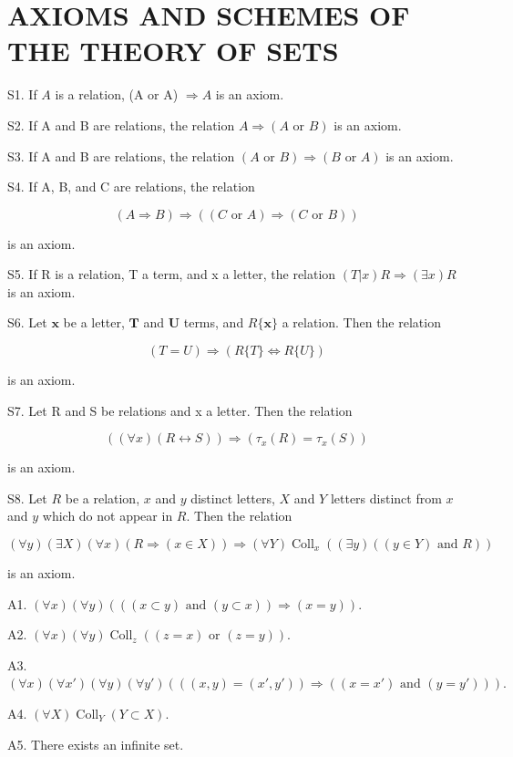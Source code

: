 \section*{AXIOMS AND SCHEMES OF THE THEORY OF SETS}
{}

S1. If \(A\) is a relation, (A or A) \(\Longrightarrow A\) is an axiom.

S2. If A and B are relations, the relation \(A \Longrightarrow (A \text{ or } B)\) is an axiom.

S3. If A and B are relations, the relation \((A \text{ or } B) \Longrightarrow (B \text{ or } A)\) is an axiom.

S4. If A, B, and C are relations, the relation

\[
(A \Rightarrow B) \Rightarrow ((C \text {   or   } A) \Rightarrow (C \text {   or   } B))
\]

is an axiom.

S5. If R is a relation, T a term, and x a letter, the relation \((T|x)R \Longrightarrow (\exists x)R\) is an axiom.

S6. Let \(\pmb{x}\) be a letter, \(\pmb{T}\) and \(\pmb{U}\) terms, and \(R\{\pmb{x}\}\) a relation. Then the relation

\[
(T = U) \Longrightarrow (R \{T \} \Longleftrightarrow R \{U \})
\]

is an axiom.

S7. Let R and S be relations and x a letter. Then the relation

\[
((\forall x) (R \leftrightarrow S)) \Longrightarrow (\tau_ {x} (R) = \tau_ {x} (S))
\]

is an axiom.

S8. Let \(R\) be a relation, \(x\) and \(y\) distinct letters, \(X\) and \(Y\) letters distinct from \(x\) and \(y\) which do not appear in \(R\). Then the relation

\[
(\forall y)(\exists X)(\forall x)(R \Longrightarrow (x \in X)) \Longrightarrow (\forall Y)\operatorname{Coll}_x((\exists y)((y \in Y) \text{ and } R))
\]

is an axiom.

A1. \((\forall x)(\forall y)(((x\subset y)\text{ and }(y\subset x))\Longrightarrow (x = y)).\)

A2. \((\forall x)(\forall y)\operatorname{Coll}_z((z = x)\text{ or }(z = y)).\)

A3. \((\forall x)(\forall x')(\forall y)(\forall y')(((x, y) = (x', y')) \Longrightarrow ((x = x')\text{ and }(y = y'))).\)

A4. \((\forall X)\operatorname{Coll}_{Y}(Y \subset X).\)

A5. There exists an infinite set.
